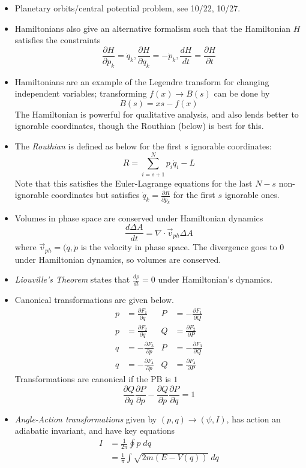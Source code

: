 \documentclass[10pt]{report}
\newcommand{\rd}[2]{\frac{d#1}{d#2}}
\newcommand{\pd}[2]{\frac{\partial #1}{\partial#2}}
\begin{document}
\begin{itemize}
    \item Planetary orbits/central potential problem, see 10/22, 10/27.
    \item Hamiltonians also give an alternative formalism such that the Hamiltonian $H$ satisfies the constraints
        $$\pd{H}{p_k} = \dot{q}_k, \pd{H}{q_k} = -\dot{p}_k, \rd{H}{t} = \pd{H}{t}$$
    \item Hamiltonians are an example of the Legendre transform for changing independent variables; transforming $f(x) \to B(s)$ can be done by
        $$B(s) = xs - f(x)$$
        The Hamiltonian is powerful for qualitative analysis, and also lends better to ignorable coordinates, though the Routhian (below) is best for this.
    \item The \emph{Routhian} is defined as below for the first $s$ ignorable coordinates:
        $$R = \sum_{i=s+1}^N p_i \dot{q}_i - L$$
        Note that this satisfies the Euler-Lagrange equations for the last $N-s$ non-ignorable coordinates but satisfies $\dot{q}_k = \pd{R}{p_k}$ for the first $s$ ignorable ones. 
    \item Volumes in phase space are conserved under Hamiltonian dynamics 
        $$\rd{\Delta A}{t} = \nabla \cdot \vec{v}_{ph}\Delta A$$
        where $\vec{v}_{ph} = (\dot{q}, \dot{p}$ is the velocity in phase space. The divergence goes to $0$ under Hamiltonian dynamics, so volumes are conserved.
    \item \emph{Liouville's Theorem} states that $\rd{\rho}{t} = 0$ under Hamiltonian's dynamics.
    \item Canonical transformations are given below.
        \begin{align*}
            p &= \pd{F_1}{q}& P &= -\pd{F_1}{Q}\\
            p &= \pd{F_2}{q}& Q &= \pd{F_2}{P}\\
            q &= -\pd{F_3}{p}& P &= -\pd{F_3}{Q}\\
            q &= -\pd{F_4}{p}& Q &= \pd{F_4}{P}     
        \end{align*}
        Transformations are canonical if the PB is $1$
        $$\pd{Q}{q}\pd{P}{p} - \pd{Q}{p}\pd{P}{q} = 1$$
    \item \emph{Angle-Action transformations} given by $(p,q) \to (\psi,I)$, has action an adiabatic invariant, and have key equations
        \begin{align*}
            I &= \frac{1}{2\pi}\oint p\; dq\\
            &=\frac{1}{\pi}\int \sqrt{2m(E-V(q))}\; dq\\

\end{align*}
\end{itemize}
\end{document}
